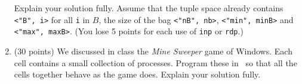 \begin{enumerate}
Explain your solution fully.  Assume that the tuple space already
contains {\tt <"B", i>} for all {\tt i} in $B$, the size of the bag
{\tt <"nB", nb>}, {\tt <"min", minB>} and {\tt <"max", maxB>}.  (You
lose 5 points for each use of {\tt inp} or {\tt rdp}.)

\item (30 points)
We discussed in class the {\em Mine Sweeper} game of Windows.  Each
cell contains a small collection of processes.  Program these
in \CSP\ so that  all the cells together behave as the game does.
Explain your solution fully.
\end{enumerate}

